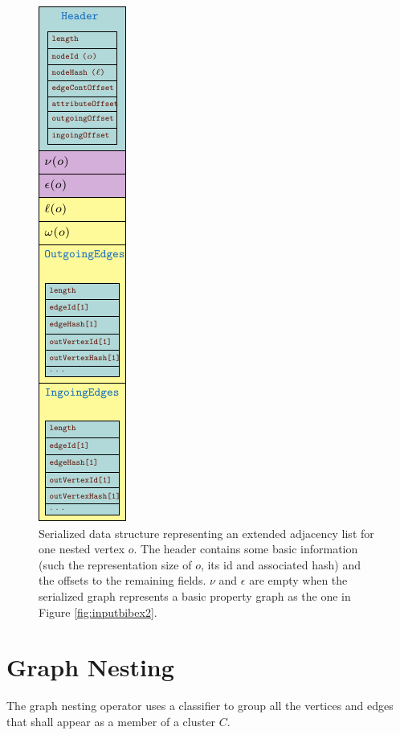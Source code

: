 \begin{figure}[!ht]
	\centering
	\includegraphics[height=.7\textheight,angle =90]{test}
	\caption{Serialized data structure representing an extended adjacency list for one nested vertex $o$. The header contains some basic information (such the representation size of $o$, its id and associated hash) and the offsets to the remaining fields. $\nu$ and $\epsilon$ are empty when the serialized graph represents a basic property graph as the one in Figure \ref{fig:inputbibex2}.}\label{nestedGraphVertex}
\end{figure}
\section{Graph Nesting}\label{sec:nestingdef}
The graph nesting operator uses a classifier to group all the vertices and edges that shall appear as a member of a cluster $C$. 

